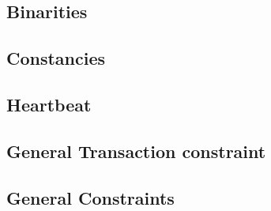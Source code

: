 \subsection{Binarities}						
\subsection{Constancies}						
\subsection{Heartbeat}			
\subsection{General Transaction constraint  }
\subsection{General Constraints}          